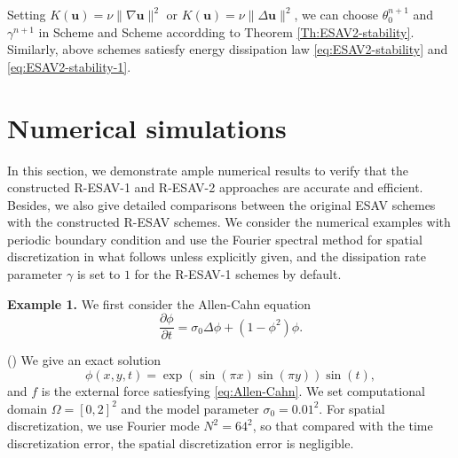 \documentclass[final,review,onefignum,onetabnum]{siamart190516}
\theoremstyle{plain}
\newtheorem{remark}{\textbf{Remark}}[section]
\begin{document}
 Setting $K(\mathbf{u})=\nu\|\nabla \mathbf{u}\|^{2}$ or $K(\mathbf{u})=\nu\|\Delta \mathbf{u}\|^{2}$,  we can choose $\theta_{0}^{n+1}$ and $\gamma^{n+1}$ in  Scheme \uppercase\expandafter{} and Scheme \uppercase\expandafter{} accordding to Theorem \ref{Th:ESAV2-stability}. 
 Similarly, above schemes satiesfy energy dissipation law \eqref{eq:ESAV2-stability} and \eqref{eq:ESAV2-stability-1}.

% 
%
%

  
 \section{Numerical simulations}
 \label{sec:numerical-simulations}
In this section, we demonstrate ample numerical results to verify that the constructed  R-ESAV-1 and R-ESAV-2 approaches are accurate and 
efficient. Besides, we also give detailed comparisons between the original ESAV schemes with the constructed R-ESAV schemes. We consider the numerical examples with periodic boundary condition and use the Fourier spectral method for spatial discretization in what follows unless explicitly given, and the dissipation rate parameter $\gamma$ is set to $1$ for the R-ESAV-1 schemes by default.

\textbf{Example 1.} We first consider the Allen-Cahn equation 
\begin{equation}\label{eq:Allen-Cahn}
\frac{\partial \phi}{\partial t}=\sigma_0 \Delta \phi+\left(1-\phi^{2}\right) \phi.
\end{equation}

() We give an exact solution
\begin{equation} \label{eq:AC-CH-exact-solution-example}
\phi(x, y, t)=\exp (\sin (\pi x) \sin (\pi y)) \sin (t),
\end{equation}
and $f$ is the external force satiesfying \eqref{eq:Allen-Cahn}. 
We set computational domain $\Omega=[0, 2]^2$ and the model parameter $\sigma_0=0.01^2$. For spatial discretization, we use Fourier mode $N^2=64^2$, so that compared with the time discretization error, the spatial discretization error is negligible.
\end{document}
